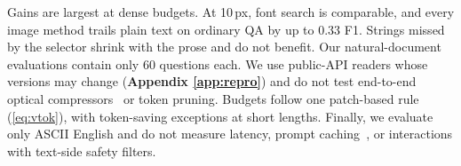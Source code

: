 Gains are largest at dense budgets. At 10\,px, font search is comparable, and every image method trails plain text on ordinary QA by up to 0.33 F1. Strings missed by the selector shrink with the prose and do not benefit. Our natural-document evaluations contain only 60 questions each. We use public-API readers whose versions may change (\textbf{Appendix \ref{app:repro}}) and do not test end-to-end optical compressors~\cite{wei2025deepseekocr,cheng2025glyph} or token pruning. Budgets follow one patch-based rule (\cref{eq:vtok}), with token-saving exceptions at short lengths. Finally, we evaluate only ASCII English and do not measure latency, prompt caching~\cite{gim2024promptcache}, or interactions with text-side safety filters.